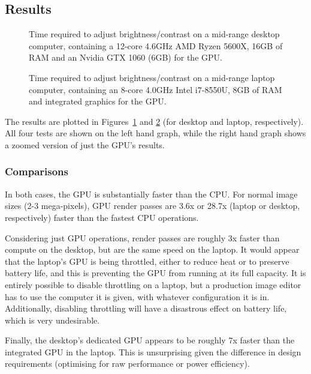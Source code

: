 \documentclass[12pt]{article}
\begin{document}
\subsection{Results}

\begin{figure}
    
    \caption{Time required to adjust brightness/contrast on a mid-range desktop computer, containing
    a 12-core 4.6GHz AMD Ryzen 5600X, 16GB of RAM and an Nvidia GTX 1060 (6GB) for the
    GPU.}\label{fig:pc-results}
\end{figure}

\begin{figure}
    
    \caption{Time required to adjust brightness/contrast on a mid-range laptop computer, containing
    an 8-core 4.0GHz Intel i7-8550U, 8GB of RAM and integrated graphics for the
    GPU.}\label{fig:laptop-results}
\end{figure}

The results are plotted in Figures~\ref{fig:pc-results} and \ref{fig:laptop-results} (for desktop
and laptop, respectively).  All four tests are shown on the left hand graph, while the right hand
graph shows a zoomed version of just the GPU's results.  

\subsubsection{Comparisons}

In both cases, the GPU is substantially faster than the CPU.  For normal image sizes (2-3
mega-pixels), GPU render passes are 3.6x or 28.7x (laptop or desktop, respectively) faster than the
fastest CPU operations.

Considering just GPU operations, render passes are roughly 3x faster than compute on the desktop,
but are the same speed on the laptop.  It would appear that the laptop's GPU is being throttled,
either to reduce heat or to preserve battery life, and this is preventing the GPU from running at
its full capacity.  It is entirely possible to disable throttling on a laptop, but a production
image editor has to use the computer it is given, with whatever configuration it is in.
Additionally, disabling throttling will have a disastrous effect on battery life, which is very
undesirable.

Finally, the desktop's dedicated GPU appears to be roughly 7x faster than the integrated GPU in the
laptop.  This is unsurprising given the difference in design requirements (optimising for raw
performance or power efficiency).
\end{document}
